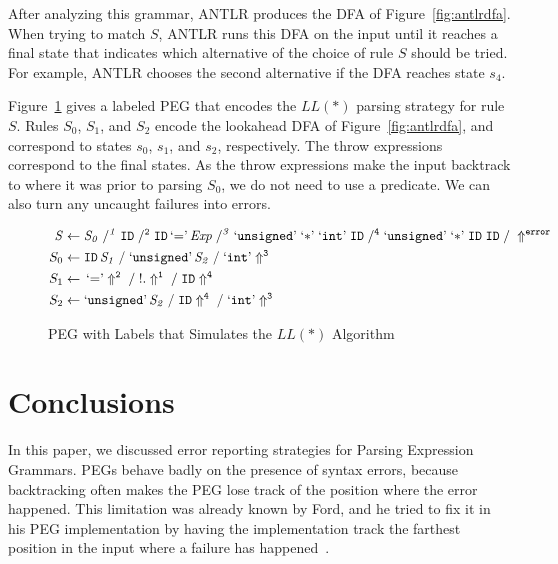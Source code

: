 \documentclass[3p,12pt,singlecolumn]{elsarticle}
\newcommand{\throw}{\Uparrow}
\begin{document}
After analyzing this grammar, ANTLR produces the DFA
of Figure~\ref{fig:antlrdfa}. When trying to match $S$,
ANTLR runs this DFA on the input until it reaches a
final state that indicates which alternative of the
choice of rule $S$ should be tried. For example,
ANTLR chooses the second alternative if the DFA
reaches state $s_4$.

Figure~\ref{fig:pegllstar} gives a labeled PEG that encodes
the $LL(*)$ parsing strategy for rule $S$. Rules $S_0$,
$S_1$, and $S_2$ encode the lookahead DFA of Figure~\ref{fig:antlrdfa}, and correspond to states
$s_0$, $s_1$, and $s_2$, respectively. The throw
expressions correspond to the final states.
As the throw expressions make the input backtrack to where
it was prior to parsing $S_0$, we do not need to use a
predicate. We can also turn any uncaught failures into
errors.

\begin{figure}[t]
\begin{align*}
\it{S} & \leftarrow \it{S_0} \;/^{1}\; \tt{ID} \;/^{2}\;
	             \tt{ID} \,`\tt{=}\textrm'\, \it{Exp} \;/^{3}\; 
               `\tt{unsigned}\textrm' \; `\tt{*}\textrm' \; `\tt{int}\textrm' \; \tt{ID} \;/^{4}\;
               `\tt{unsigned}\textrm' \; `\tt{*}\textrm' \; \tt{ID}  \; \tt{ID}
\;/\; \throw^{\tt error} \\
S_0 & \leftarrow \tt{ID} \, \it{S_1}  \;/\; `\tt{unsigned}\textrm' \, \it{S_2}  \;/\;  `\tt{int}\textrm' \throw^3 \\
S_1 & \leftarrow \,`\tt{=}\textrm' \throw^2  \;/\;  !. \throw^1  \;/\;  \tt{ID} \throw^4  \\
S_2 & \leftarrow `\tt{unsigned}\textrm' \, \it{S_2}  \;/\;  \tt{ID} \throw^4  \;/\;  `\tt{int}\textrm' \throw^3
\end{align*}
\caption{PEG with Labels that Simulates the $LL(*)$ Algorithm}
\label{fig:pegllstar}
\end{figure}



\section{Conclusions} 
\label{sec:conc}

In this paper, we discussed error reporting strategies for
Parsing Expression Grammars. PEGs behave badly on the presence
of syntax errors, because backtracking often makes the PEG
lose track of the position where the error happened.
This limitation was already known by Ford, and he
tried to fix it in his PEG implementation by having
the implementation track the farthest position in the
input where a failure has happened~\cite{ford2002packrat}.
\end{document}
